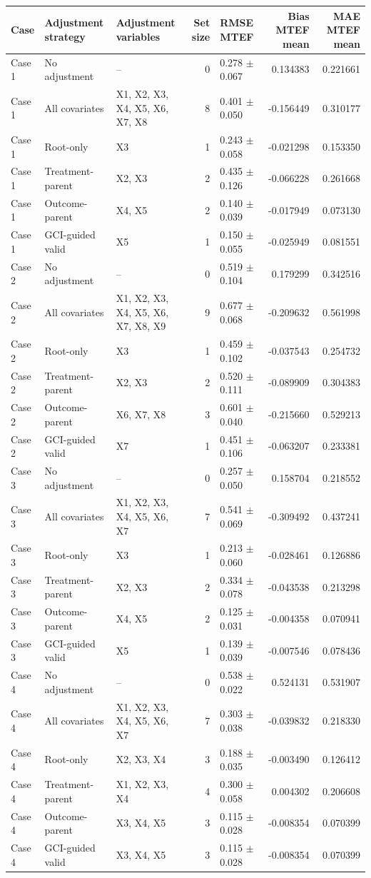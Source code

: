 \begin{tabular}{lllrlrr}
\toprule
Case & Adjustment strategy & Adjustment variables & Set size & RMSE MTEF & Bias MTEF mean & MAE MTEF mean \\
\midrule
Case 1 & No adjustment & -- & 0 & 0.278 $\pm$ 0.067 & 0.134383 & 0.221661 \\
Case 1 & All covariates & X1, X2, X3, X4, X5, X6, X7, X8 & 8 & 0.401 $\pm$ 0.050 & -0.156449 & 0.310177 \\
Case 1 & Root-only & X3 & 1 & 0.243 $\pm$ 0.058 & -0.021298 & 0.153350 \\
Case 1 & Treatment-parent & X2, X3 & 2 & 0.435 $\pm$ 0.126 & -0.066228 & 0.261668 \\
Case 1 & Outcome-parent & X4, X5 & 2 & 0.140 $\pm$ 0.039 & -0.017949 & 0.073130 \\
Case 1 & GCI-guided valid & X5 & 1 & 0.150 $\pm$ 0.055 & -0.025949 & 0.081551 \\
Case 2 & No adjustment & -- & 0 & 0.519 $\pm$ 0.104 & 0.179299 & 0.342516 \\
Case 2 & All covariates & X1, X2, X3, X4, X5, X6, X7, X8, X9 & 9 & 0.677 $\pm$ 0.068 & -0.209632 & 0.561998 \\
Case 2 & Root-only & X3 & 1 & 0.459 $\pm$ 0.102 & -0.037543 & 0.254732 \\
Case 2 & Treatment-parent & X2, X3 & 2 & 0.520 $\pm$ 0.111 & -0.089909 & 0.304383 \\
Case 2 & Outcome-parent & X6, X7, X8 & 3 & 0.601 $\pm$ 0.040 & -0.215660 & 0.529213 \\
Case 2 & GCI-guided valid & X7 & 1 & 0.451 $\pm$ 0.106 & -0.063207 & 0.233381 \\
Case 3 & No adjustment & -- & 0 & 0.257 $\pm$ 0.050 & 0.158704 & 0.218552 \\
Case 3 & All covariates & X1, X2, X3, X4, X5, X6, X7 & 7 & 0.541 $\pm$ 0.069 & -0.309492 & 0.437241 \\
Case 3 & Root-only & X3 & 1 & 0.213 $\pm$ 0.060 & -0.028461 & 0.126886 \\
Case 3 & Treatment-parent & X2, X3 & 2 & 0.334 $\pm$ 0.078 & -0.043538 & 0.213298 \\
Case 3 & Outcome-parent & X4, X5 & 2 & 0.125 $\pm$ 0.031 & -0.004358 & 0.070941 \\
Case 3 & GCI-guided valid & X5 & 1 & 0.139 $\pm$ 0.039 & -0.007546 & 0.078436 \\
Case 4 & No adjustment & -- & 0 & 0.538 $\pm$ 0.022 & 0.524131 & 0.531907 \\
Case 4 & All covariates & X1, X2, X3, X4, X5, X6, X7 & 7 & 0.303 $\pm$ 0.038 & -0.039832 & 0.218330 \\
Case 4 & Root-only & X2, X3, X4 & 3 & 0.188 $\pm$ 0.035 & -0.003490 & 0.126412 \\
Case 4 & Treatment-parent & X1, X2, X3, X4 & 4 & 0.300 $\pm$ 0.058 & 0.004302 & 0.206608 \\
Case 4 & Outcome-parent & X3, X4, X5 & 3 & 0.115 $\pm$ 0.028 & -0.008354 & 0.070399 \\
Case 4 & GCI-guided valid & X3, X4, X5 & 3 & 0.115 $\pm$ 0.028 & -0.008354 & 0.070399 \\
\bottomrule
\end{tabular}
